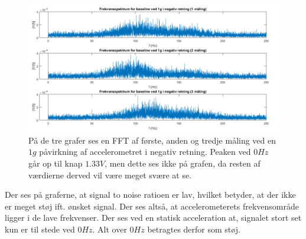 \begin{figure}[H]
	\centering
	\includegraphics[scale=0.5]{figures/cProblemloesning/Pilotforsoeg_FrekvensN.png}
	\caption{På de tre grafer ses en FFT af første, anden og tredje måling ved en $1g$ påvirkning af accelerometret i negativ retning. Peaken ved $0Hz$ går op til knap $1.33V$, men dette ses ikke på grafen, da resten af værdierne derved vil være meget svære at se.}
	\label{Fig:Pilot_FFTN}
\end{figure}

\noindent Der ses på graferne, at signal to noise ratioen er lav, hvilket betyder, at der ikke er meget støj ift. ønsket signal. Der ses altså, at accelerometerets frekvensområde ligger i de lave frekvenser. Der ses ved en statisk acceleration at, signalet stort set kun er til stede ved $0Hz$. Alt over $0Hz$ betragtes derfor som støj. 


